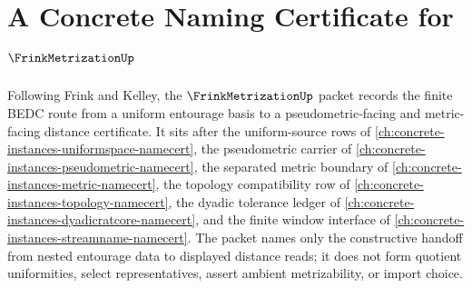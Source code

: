 \chapter{A Concrete Naming Certificate for $\FrinkMetrizationUp$}
\label{ch:concrete-instances-frink-metrization-namecert}

Following Frink and Kelley, the $\FrinkMetrizationUp$ packet records the finite BEDC route from a uniform entourage basis to a pseudometric-facing and metric-facing distance certificate. It sits after the uniform-source rows of \autoref{ch:concrete-instances-uniformspace-namecert}, the pseudometric carrier of \autoref{ch:concrete-instances-pseudometric-namecert}, the separated metric boundary of \autoref{ch:concrete-instances-metric-namecert}, the topology compatibility row of \autoref{ch:concrete-instances-topology-namecert}, the dyadic tolerance ledger of \autoref{ch:concrete-instances-dyadicratcore-namecert}, and the finite window interface of \autoref{ch:concrete-instances-streamname-namecert}. The packet names only the constructive handoff from nested entourage data to displayed distance reads; it does not form quotient uniformities, select representatives, assert ambient metrizability, or import choice.

